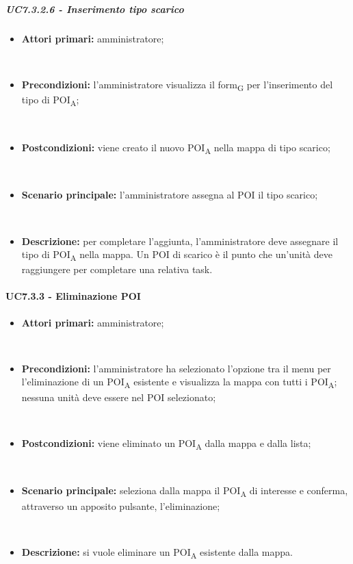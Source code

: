 \subparagraph{UC7.3.2.6 - Inserimento tipo scarico}

\begin{itemize}

​    \item   \textbf{Attori primari:} amministratore;

​    \item   \textbf{Precondizioni:} l'amministratore visualizza il form\textsubscript{G} per l'inserimento del tipo di POI\textsubscript{A};

​    \item   \textbf{Postcondizioni:} viene creato il nuovo POI\textsubscript{A} nella mappa di tipo scarico; 

​    \item   \textbf{Scenario principale:} l'amministratore assegna al POI il tipo scarico;

​    \item   \textbf{Descrizione:} per completare l'aggiunta, l'amministratore deve assegnare il tipo di POI\textsubscript{A} nella mappa. Un POI di scarico è il punto che un'unità deve raggiungere per completare una relativa task.



\end{itemize}





\paragraph{UC7.3.3 - Eliminazione POI}

\begin{itemize}

​    \item   \textbf{Attori primari:} amministratore;

​    \item   \textbf{Precondizioni:} l'amministratore ha selezionato l'opzione tra il menu per l'eliminazione di un POI\textsubscript{A} esistente e visualizza la mappa con tutti i POI\textsubscript{A}; nessuna unità deve essere nel POI selezionato;

​    \item   \textbf{Postcondizioni:} viene eliminato un POI\textsubscript{A} dalla mappa e dalla lista; 

​    \item   \textbf{Scenario principale:} seleziona dalla mappa il POI\textsubscript{A} di interesse e conferma, attraverso un apposito pulsante, l'eliminazione;

​    \item   \textbf{Descrizione:} si vuole eliminare un POI\textsubscript{A} esistente dalla mappa.

\end{itemize}
